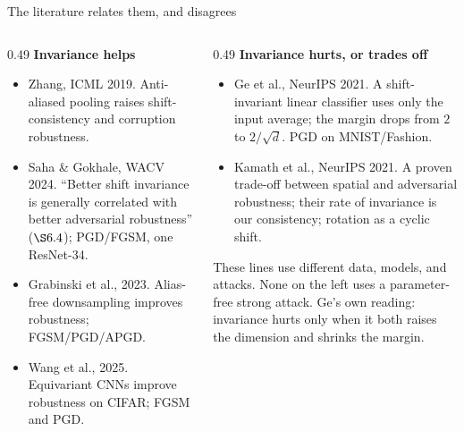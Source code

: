 \documentclass[aspectratio=169,10pt]{beamer}
\newcommand{\tb}[1]{{\color{TUMblue}#1}}
\begin{document}
\begin{frame}{The literature relates them, and disagrees}{}
  \vspace{0.2em}
  \begin{columns}[T]
    \begin{column}{0.49\textwidth}
      {\footnotesize\textbf{\color{good}Invariance helps}}
      \begin{itemize}\scriptsize\itemsep3pt
        \item \tb{Zhang, ICML 2019.} Anti-aliased pooling raises shift-consistency and corruption robustness.
        \item \tb{Saha \& Gokhale, WACV 2024.} ``Better shift invariance is generally correlated with
          better adversarial robustness'' ($\S6.4$); PGD/FGSM, one ResNet-34.
        \item \tb{Grabinski et al., 2023.} Alias-free downsampling improves robustness; FGSM/PGD/APGD.
        \item \tb{Wang et al., 2025.} Equivariant CNNs improve robustness on CIFAR; FGSM and PGD.
      \end{itemize}
    \end{column}
    \begin{column}{0.49\textwidth}
      {\footnotesize\textbf{\color{bad}Invariance hurts, or trades off}}
      \begin{itemize}\scriptsize\itemsep3pt
        \item \tb{Ge et al., NeurIPS 2021.} A shift-invariant linear classifier uses only the input
          average; the margin drops from $2$ to $2/\sqrt d$. PGD on MNIST/Fashion.
        \item \tb{Kamath et al., NeurIPS 2021.} A proven trade-off between spatial and adversarial
          robustness; their rate of invariance is our consistency; rotation as a cyclic shift.
      \end{itemize}
      \vspace{0.5em}
      {\scriptsize\color{slate} These lines use different data, models, and attacks. None on the left
      uses a parameter-free strong attack. Ge's own reading: invariance hurts only when it both raises
      the dimension and shrinks the margin.}
    \end{column}
  \end{columns}
\end{frame}
\end{document}
